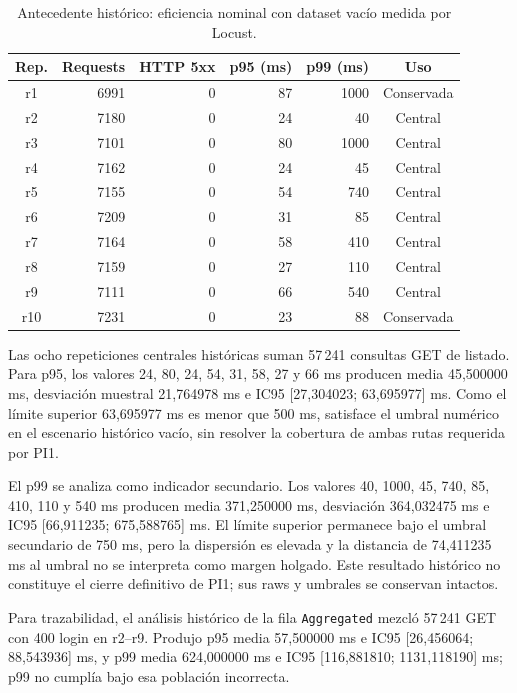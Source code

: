 \begin{table}[ht]
  \centering
  \small
  \caption{Antecedente histórico: eficiencia nominal con dataset vacío medida por Locust.}
  \label{tab:repeticiones-eficiencia}
  \begin{tabular}{|c|r|r|r|r|c|}
    \hline
    \textbf{Rep.} & \textbf{Requests} & \textbf{HTTP 5xx} & \textbf{p95 (ms)} & \textbf{p99 (ms)} & \textbf{Uso} \\
    \hline
    r1  & 6991 & 0 & 87 & 1000 & Conservada \\
    r2  & 7180 & 0 & 24 & 40   & Central \\
    r3  & 7101 & 0 & 80 & 1000 & Central \\
    r4  & 7162 & 0 & 24 & 45   & Central \\
    r5  & 7155 & 0 & 54 & 740  & Central \\
    r6  & 7209 & 0 & 31 & 85   & Central \\
    r7  & 7164 & 0 & 58 & 410  & Central \\
    r8  & 7159 & 0 & 27 & 110  & Central \\
    r9  & 7111 & 0 & 66 & 540  & Central \\
    r10 & 7231 & 0 & 23 & 88   & Conservada \\
    \hline
  \end{tabular}
\end{table}

Las ocho repeticiones centrales históricas suman 57\,241 consultas GET de
listado. Para p95, los valores 24, 80, 24, 54, 31, 58, 27 y 66 ms producen media
45,500000 ms, desviación muestral 21,764978 ms e IC95
[27,304023; 63,695977] ms. Como el límite superior 63,695977 ms es menor que
500 ms, satisface el umbral numérico en el escenario histórico vacío, sin
resolver la cobertura de ambas rutas requerida por PI1.

El p99 se analiza como indicador secundario. Los valores 40, 1000, 45, 740, 85,
410, 110 y 540 ms producen media 371,250000 ms, desviación 364,032475 ms e IC95
[66,911235; 675,588765] ms. El límite superior permanece bajo el umbral
secundario de 750 ms, pero la dispersión es elevada y la distancia de
74,411235 ms al umbral no se interpreta como margen holgado. Este resultado
histórico no constituye el cierre definitivo de PI1; sus raws y umbrales se
conservan intactos.

Para trazabilidad, el análisis histórico de la fila \texttt{Aggregated} mezcló
57\,241 GET con 400 login en r2--r9. Produjo p95 media 57,500000 ms e IC95
[26,456064; 88,543936] ms, y p99 media 624,000000 ms e IC95
[116,881810; 1131,118190] ms; p99 no cumplía bajo esa población incorrecta.


